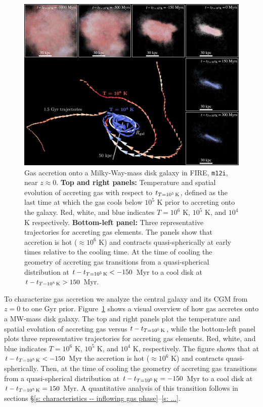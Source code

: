 \documentclass[fleqn,usenatbib]{mnras}
\newcommand{\tcon}{t_{T=10^5\,{\rm K}}}
\begin{document}
\begin{figure}
    \centering
    \includegraphics[width=\textwidth]{figures/illustrative_tracks/illustrative_tracks.png}
    \caption{
Gas accretion onto a Milky-Way-mass disk galaxy in FIRE, \texttt{m12i}, near $z\approx0$.
\textbf{Top and right panels:}
Temperature and spatial evolution of accreting gas with respect to $\tcon$, defined as the last time at which the gas cools below $10^5$ K prior to accreting onto the galaxy. 
Red, white, and blue indicates $T=10^6$ K, $10^5$ K, and $10^4$ K respectively. 
\textbf{Bottom-left panel:}
Three representative trajectories for accreting gas elements.
The panels show that accretion is hot ($\approx 10^6$ K) and contracts quasi-spherically at early times relative to the cooling time. At the time of cooling the geometry of accreting gas transitions from a quasi-spherical distribution at $t-\tcon < -150$ Myr to a cool disk at $t-\tcon > 150$ Myr.
    }
    \label{f: overview}
\end{figure}

To characterize gas accretion we analyze the central galaxy and its CGM from $z=0$ to one Gyr prior.
Figure~\ref{f: overview} shows a visual overview of how gas accretes onto a MW-mass disk galaxy. 
The top and right panels plot the temperature and spatial evolution of accreting gas versus $t-\tcon$, while the bottom-left panel plots three representative trajectories for accreting gas elements. 
Red, white, and blue indicates $T=10^6$ K, $10^5$ K, and $10^4$ K, respectively. The figure shows that at $t-\tcon<-150$ Myr the accretion is hot ($\approx10^6$ K) and contracts quasi-spherically. Then, at the time of cooling the geometry of accreting gas transitions from a quasi-spherical distribution at $t - \tcon=-150$ Myr to a cool disk at $t - \tcon=150$ Myr. A quantitative analysis of this transition follows in sections \S\ref{s: characteristics -- inflowing gas phase}--\ref{s: ...}.
\end{document}
